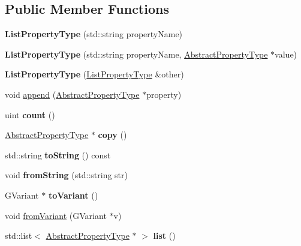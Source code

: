 \subsection*{Public Member Functions}
\begin{DoxyCompactItemize}
\item 
\hypertarget{classListPropertyType_a5e6f35179b6e7c79cf7dd831db1f5ffd}{{\bfseries List\-Property\-Type} (std\-::string property\-Name)}\label{classListPropertyType_a5e6f35179b6e7c79cf7dd831db1f5ffd}

\item 
\hypertarget{classListPropertyType_a72d99362f99900b292e0a8e78e9d2d2f}{{\bfseries List\-Property\-Type} (std\-::string property\-Name, \hyperlink{classAbstractPropertyType}{Abstract\-Property\-Type} $\ast$value)}\label{classListPropertyType_a72d99362f99900b292e0a8e78e9d2d2f}

\item 
\hypertarget{classListPropertyType_a97b74dbcac25f0ea6610bfea24916ef6}{{\bfseries List\-Property\-Type} (\hyperlink{classListPropertyType}{List\-Property\-Type} \&other)}\label{classListPropertyType_a97b74dbcac25f0ea6610bfea24916ef6}

\item 
void \hyperlink{classListPropertyType_a18501d9e46af59ee269c6c6473ff0c99}{append} (\hyperlink{classAbstractPropertyType}{Abstract\-Property\-Type} $\ast$property)
\item 
\hypertarget{classListPropertyType_a03589ed61592cf3061542b73abf00c67}{uint {\bfseries count} ()}\label{classListPropertyType_a03589ed61592cf3061542b73abf00c67}

\item 
\hypertarget{classListPropertyType_a2b4d928c8fa6c7317a31d4aa376908d1}{\hyperlink{classAbstractPropertyType}{Abstract\-Property\-Type} $\ast$ {\bfseries copy} ()}\label{classListPropertyType_a2b4d928c8fa6c7317a31d4aa376908d1}

\item 
\hypertarget{classListPropertyType_a7c0f0a4ab1d1ceaf4d7abfbdade7f5ea}{std\-::string {\bfseries to\-String} () const }\label{classListPropertyType_a7c0f0a4ab1d1ceaf4d7abfbdade7f5ea}

\item 
\hypertarget{classListPropertyType_aa49d1bc6968d7201b4d836b5049133f0}{void {\bfseries from\-String} (std\-::string str)}\label{classListPropertyType_aa49d1bc6968d7201b4d836b5049133f0}

\item 
\hypertarget{classListPropertyType_ab0a0e192757158cd9901becacbafdb41}{G\-Variant $\ast$ {\bfseries to\-Variant} ()}\label{classListPropertyType_ab0a0e192757158cd9901becacbafdb41}

\item 
void \hyperlink{classListPropertyType_aa76b2385816ce8a12982109d632b6b93}{from\-Variant} (G\-Variant $\ast$v)
\item 
\hypertarget{classListPropertyType_a764a0d0ab730b7821514d7158e1df05b}{std\-::list$<$ \hyperlink{classAbstractPropertyType}{Abstract\-Property\-Type} $\ast$ $>$ {\bfseries list} ()}\label{classListPropertyType_a764a0d0ab730b7821514d7158e1df05b}

\end{DoxyCompactItemize}
